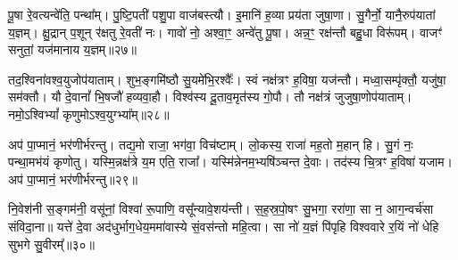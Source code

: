पू॒षा रे॒वत्यन्वे॑ति॒ पन्था᳚म्। पु॒ष्टि॒पती॑ पशु॒पा वाज॑बस्त्यौ। इ॒मानि॑ ह॒व्या प्रय॑ता जुषा॒णा। सु॒गैर्नो॒ यानै॒रुप॑यातां य॒ज्ञम्। क्षु॒द्रान् प॒शून् र॑क्षतु रे॒वती॑ नः। गावो॑ नो॒ अश्वा॒ꣳ॒ अन्वे॑तु पू॒षा। अन्न॒ꣳ॒ रक्ष॑न्तौ बहु॒धा विरू॑पम्। वाजꣳ॑ सनुतां॒ यज॑मानाय य॒ज्ञम्॥२७॥ 

तद॒श्विना॑वश्व॒युजोप॑याताम्। शुभ॒ङ्गमि॑ष्ठौ सु॒यमे॑भि॒रश्वैः᳚। स्वं नक्ष॑त्रꣳ ह॒विषा॒ यज॑न्तौ। मध्वा॒सम्पृ॑क्तौ॒ यजु॑षा॒ सम॑क्तौ। यौ दे॒वानां᳚ भि॒षजौ॑ हव्यवा॒हौ। विश्व॑स्य दू॒ताव॒मृत॑स्य गो॒पौ। तौ नक्ष॑त्रं जुजुषा॒णोप॑याताम्। नमो॒ऽश्विभ्यां᳚ कृणुमोऽश्व॒युग्भ्या᳚म्॥२८॥ 

अप॑ पा॒प्मानं॒ भर॑णीर्भरन्तु। तद्य॒मो राजा॒ भग॑वा॒\an{} विच॑ष्टाम्। लो॒कस्य॒ राजा॑ मह॒तो म॒हान् हि। सु॒गं नः॒ पन्था॒मभ॑यं कृणोतु। यस्मि॒न्नक्ष॑त्रे य॒म एति॒ राजा᳚। यस्मि॑न्नेनम॒भ्यषि॑ञ्चन्त दे॒वाः। तद॑स्य चि॒त्रꣳ ह॒विषा॑ यजाम। अप॑ पा॒प्मानं॒ भर॑णीर्भरन्तु॥२९॥ 

नि॒वेश॑नी स॒ङ्गम॑नी॒ वसू॑नां॒ विश्वा॑ रू॒पाणि॒ वसू᳚न्यावे॒शय॑न्ती। स॒ह॒स्र॒पो॒षꣳ सु॒भगा॒ ररा॑णा॒ सा न॒ आग॒न्वर्च॑सा संविदा॒ना॥ यत्ते॑ दे॒वा अद॑धुर्भाग॒धेय॒ममा॑वास्ये सं॒वस॑न्तो महि॒त्वा। सा नो॑ य॒ज्ञं पि॑पृहि विश्ववारे र॒यिं नो॑ धेहि सुभगे सु॒वीरम्᳚॥३०॥ 